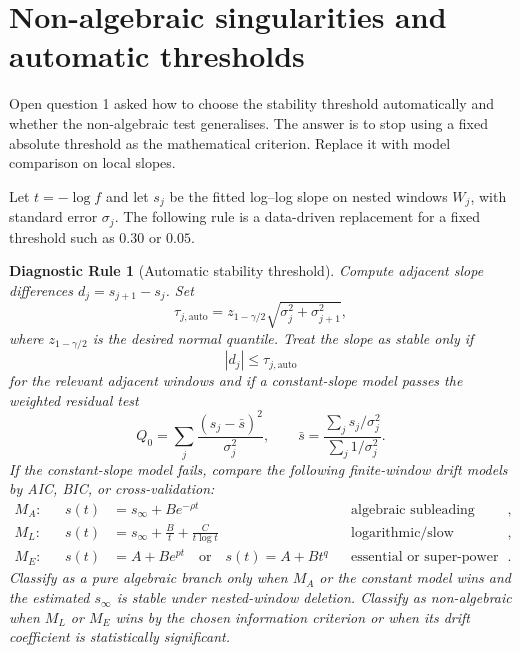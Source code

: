 \documentclass[11pt,a4paper]{article}
\newtheorem{diagnostic}[theorem]{Diagnostic Rule}
\begin{document}
\section{Non-algebraic singularities and automatic thresholds}\label{sec:non-algebraic}

Open question 1 asked how to choose the stability threshold automatically and whether the non-algebraic test generalises. The answer is to stop using a fixed absolute threshold as the mathematical criterion. Replace it with model comparison on local slopes.

Let $t=-\log f$ and let $s_j$ be the fitted log--log slope on nested windows $W_j$, with standard error $\sigma_j$. The following rule is a data-driven replacement for a fixed threshold such as $0.30$ or $0.05$.

\begin{diagnostic}[Automatic stability threshold]\label{diag:auto-threshold}
Compute adjacent slope differences $d_j=s_{j+1}-s_j$. Set
\begin{equation}\label{eq:auto-threshold}
    \tau_{j,\mathrm{auto}}
    =z_{1-\gamma/2}\sqrt{\sigma_j^2+\sigma_{j+1}^2},
\end{equation}
where $z_{1-\gamma/2}$ is the desired normal quantile. Treat the slope as stable only if
\[
    |d_j|\le \tau_{j,\mathrm{auto}}
\]
for the relevant adjacent windows and if a constant-slope model passes the weighted residual test
\begin{equation}\label{eq:chi-square-stability}
    Q_0=\sum_j\frac{(s_j-\bar{s})^2}{\sigma_j^2},
    \qquad
    \bar{s}=\frac{\sum_j s_j/\sigma_j^2}{\sum_j1/\sigma_j^2}.
\end{equation}
If the constant-slope model fails, compare the following finite-window drift models by AIC, BIC, or cross-validation:
\begin{align*}
    M_A:&&s(t)&=s_\infty+B e^{-\rho t} &&\text{algebraic subleading powers},\\
    M_L:&&s(t)&=s_\infty+\frac{B}{t}+\frac{C}{t\log t} &&\text{logarithmic/slow variation},\\
    M_E:&&s(t)&=A+B e^{pt} \quad\text{or}\quad s(t)=A+B t^q &&\text{essential or super-power drift}.
\end{align*}
Classify as a pure algebraic branch only when $M_A$ or the constant model wins and the estimated $s_\infty$ is stable under nested-window deletion. Classify as non-algebraic when $M_L$ or $M_E$ wins by the chosen information criterion or when its drift coefficient is statistically significant.
\end{diagnostic}
\end{document}
